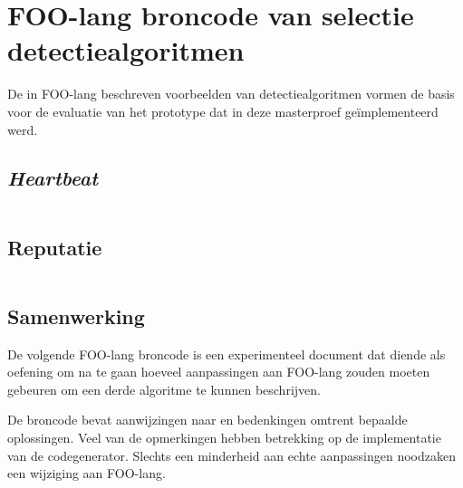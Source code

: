 
\chapter{FOO-lang broncode van selectie detectiealgoritmen}
\label{appendix:demo-code}

De in FOO-lang beschreven voorbeelden van detectiealgoritmen vormen de basis
voor de evaluatie van het prototype dat in deze masterproef ge\"implementeerd
werd.

\section{\emph{Heartbeat}}
\label{section:demo-code-heartbeat}

\inputminted[linenos,frame=lines,framesep=2mm,fontsize=\footnotesize]{js}{../src/foo-lang/examples/heartbeat.foo}
\vspace{-5mm}

\section{Reputatie}
\label{section:demo-code-reputation}

\inputminted[linenos,frame=lines,framesep=2mm,fontsize=\footnotesize]{js}{../src/foo-lang/examples/reputation.foo}
\vspace{-5mm}

\section{Samenwerking}
\label{section:demo-code-cooperation}

De volgende FOO-lang broncode is een experimenteel document dat diende als
oefening om na te gaan hoeveel aanpassingen aan FOO-lang zouden moeten gebeuren
om een derde algoritme te kunnen beschrijven.

De broncode bevat aanwijzingen naar en bedenkingen omtrent bepaalde
oplossingen. Veel van de opmerkingen hebben betrekking op de implementatie van
de codegenerator. Slechts een minderheid aan echte aanpassingen noodzaken een
wijziging aan FOO-lang.

\inputminted[linenos,frame=lines,framesep=2mm,fontsize=\footnotesize]{js}{../src/foo-lang/examples/cooperation.foo}
\vspace{-5mm}
